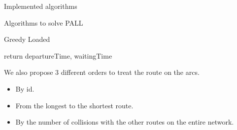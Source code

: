 \documentclass[10pt]{article}
\begin{document}
\begin{section}{Implemented algorithms}
\begin{subsection}{Algorithms to solve PALL}
\begin{subsubsection}{Greedy Loaded}
\begin{algorithm}[H]
\begin{algorithmic}
 	\ENDFOR
	\STATE return departureTime, waitingTime

 	\end{algorithmic}
 	\end{algorithm}
We also propose $3$ different orders to treat the route on the arcs. 
\begin{itemize}
\item By id.
\item From the longest to the shortest route.
\item By the number of collisions with the other routes on the entire network.
\end{itemize}
    \end{subsubsection}
  \end{subsection}

\end{section}


\end{document}
